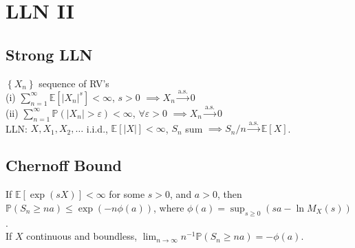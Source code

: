 \section{LLN II}
	\subsection*{Strong LLN}
	$\left\{X_{n}\right\}$ sequence of RV's\\
	(i) $\sum_{n=1}^{\infty}\mathbb{E}\left[\left|X_{n}\right|^{s}\right] < \infty$, $s > 0$ $\implies X_{n}\stackrel{\text{a.s.}}{\to}0$\\
	(ii) $\sum_{n=1}^{\infty}\mathbb{P}\left(\left|X_{n}\right| > \varepsilon\right) < \infty$, $\forall\varepsilon > 0$ $\implies  X_{n}\stackrel{\text{a.s.}}{\to}0$\\
	LLN: $X, X_{1}, X_{2}, \dots$ i.i.d., $\mathbb{E}\left[\left|X\right|\right] < \infty$, $S_{n}$ sum $\implies S_{n}/n\stackrel{\text{a.s.}}{\to}\mathbb{E}\left[X\right]$.
	
	\subsection*{Chernoff Bound}
	If $\mathbb{E}\left[\exp\left(sX\right)\right] < \infty$ for some $s > 0$, and $a > 0$, then $\mathbb{P}\left(S_{n}\geq na\right)\leq\exp\left(-n\phi\left(a\right)\right)$, where $\phi\left(a\right) = \sup_{s\geq 0}\left(sa - \ln M_{X}\left(s\right)\right)$.\\
	If $X$ continuous and boundless, $\lim_{n\to\infty}n^{-1}\mathbb{P}\left(S_{n}\geq na\right) = -\phi\left(a\right)$.
